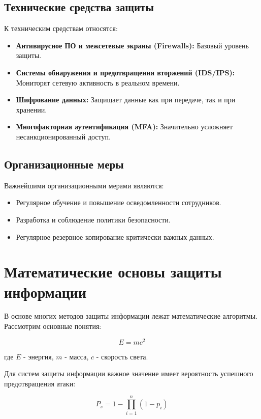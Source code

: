 \documentclass[14pt]{extreport}
\begin{document}
\subsection{Технические средства защиты}
К техническим средствам относятся:
\begin{itemize}
    \item \textbf{Антивирусное ПО и межсетевые экраны (Firewalls):} Базовый уровень защиты.
    \item \textbf{Системы обнаружения и предотвращения вторжений (IDS/IPS):} Мониторят сетевую активность в реальном времени.
    \item \textbf{Шифрование данных:} Защищает данные как при передаче, так и при хранении.
    \item \textbf{Многофакторная аутентификация (MFA):} Значительно усложняет несанкционированный доступ.
\end{itemize}

\subsection{Организационные меры}
Важнейшими организационными мерами являются:
\begin{itemize}
    \item Регулярное обучение и повышение осведомленности сотрудников.
    \item Разработка и соблюдение политики безопасности.
    \item Регулярное резервное копирование критически важных данных.
\end{itemize}

\section{Математические основы защиты информации}
\label{sec:math}

В основе многих методов защиты информации лежат математические алгоритмы. Рассмотрим основные понятия:

\begin{equation}
E = mc^2
\end{equation}

где $E$ - энергия, $m$ - масса, $c$ - скорость света.

Для систем защиты информации важное значение имеет вероятность успешного предотвращения атаки:

\begin{equation}
P_s = 1 - \prod_{i=1}^{n}(1 - p_i)
\label{eq:security}
\end{equation}
\end{document}
